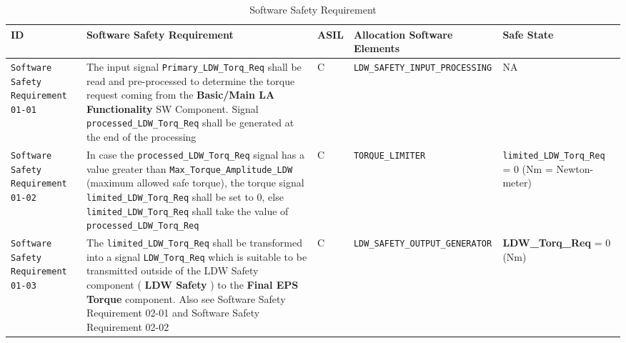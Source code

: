 \begin{table}[!htpb]
\caption{Software Safety Requirement}
\begin{center}
\scriptsize
\renewcommand{\arraystretch}{1.4}
\hspace*{-2.0cm}
\begin{tabular}{ L{1.7cm}|L{5.2cm}|L{0.5cm}|L{5.2cm}|L{3.0cm}  }
\hline
{}
ID &
Software Safety Requirement  &
ASIL &
Allocation Software Elements  &  
Safe State \\\hline
\textcolor{harmonia-blue}{\texttt{Software Safety Requirement 01-01}}  &
The input signal 
  \textcolor{dark-red}{\texttt{Primary\_LDW\_Torq\_Req}}
  shall be read and pre-processed to
  determine the torque request coming from the 
  \textbf{Basic/Main LA Functionality} SW
  Component. Signal 
  \textcolor{dark-red}{\texttt{processed\_LDW\_Torq\_Req}}
  shall be generated at the end of the processing
  &
C &
  \texttt{LDW\_SAFETY\_INPUT\_PROCESSING}  &
  NA
\\\hline
\textcolor{harmonia-blue}{\texttt{Software Safety Requirement 01-02}}  &
In case the 
  \textcolor{dark-red}{\texttt{processed\_LDW\_Torq\_Req}} 
  signal has a value greater than
  \textcolor{dark-red}{\texttt{Max\_Torque\_Amplitude\_LDW}} 
  (maximum allowed safe torque), the torque signal
  \textcolor{dark-red}{\texttt{limited\_LDW\_Torq\_Req}} 
  shall be set to 0, else 
  \textcolor{dark-red}{\texttt{limited\_LDW\_Torq\_Req}} 
  shall take the value of 
  \textcolor{dark-red}{\texttt{processed\_LDW\_Torq\_Req}}  &
C &
  \texttt{TORQUE\_LIMITER}  &
  \textcolor{dark-red}{\texttt{limited\_LDW\_Torq\_Req}} = 0 (Nm = Newton-meter)
\\\hline
\textcolor{harmonia-blue}{\texttt{Software Safety Requirement 01-03}}  &
  The 
  \textcolor{dark-red}{\texttt{limited\_LDW\_Torq\_Req}}
  shall be transformed into a signal 
  \textcolor{dark-red}{\texttt{LDW\_Torq\_Req}}
  which is suitable to be transmitted outside of the LDW Safety component (
  \textbf{LDW Safety} ) to the 
  \textbf{Final EPS Torque} component. 
  Also see Software Safety Requirement 02-01 and 
  Software Safety Requirement 02-02
  &
C &
\textcolor{dark-red}{\texttt{LDW\_SAFETY\_OUTPUT\_GENERATOR}} &
\textbf{LDW\_Torq\_Req} = 0 (Nm)
\\\hline
\end{tabular}
\end{center}
\label{tab:tr01}
\end{table}





